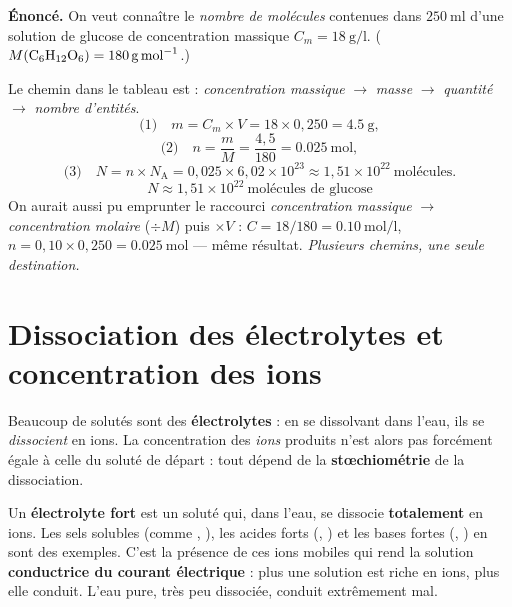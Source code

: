 \documentclass[11pt,a4paper]{article}
\newcommand{\NA}{N_{\!\text{A}}}
\begin{document}
\begin{exemple}
\textbf{Énoncé.} On veut connaître le \emph{nombre de molécules} contenues dans $\SI{250}{\milli\litre}$
d'une solution de glucose  de concentration massique $C_m = \SI{18}{\gram\per\litre}$.
($M(\ce{C6H12O6}) = \SI{180}{\gram\per\mole}$.)

\smallskip
Le chemin dans le tableau est : \emph{concentration massique} $\to$ \emph{masse} $\to$ \emph{quantité}
$\to$ \emph{nombre d'entités}.
\[ \text{(1)}\quad m = C_m\times V = 18 \times 0{,}250 = \SI{4.5}{\gram}, \]
\[ \text{(2)}\quad n = \frac{m}{M} = \frac{4{,}5}{180} = \SI{0.025}{\mole}, \]
\[ \text{(3)}\quad N = n\times\NA = 0{,}025 \times 6{,}02\times10^{23} \approx 1{,}51\times10^{22}\ \text{molécules}. \]
\[ \boxed{N \approx 1{,}51\times10^{22}\ \text{molécules de glucose}} \]
On aurait aussi pu emprunter le raccourci \emph{concentration massique} $\to$ \emph{concentration
molaire} ($\div M$) puis $\times V$ : $C = 18/180 = \SI{0.10}{\mole\per\litre}$, $n = 0{,}10\times0{,}250
= \SI{0.025}{\mole}$ — même résultat. \emph{Plusieurs chemins, une seule destination.}
\end{exemple}

\section{Dissociation des électrolytes et concentration des ions}
Beaucoup de solutés sont des \textbf{électrolytes} : en se dissolvant dans l'eau, ils se
\emph{dissocient} en ions. La concentration des \emph{ions} produits n'est alors pas forcément égale
à celle du soluté de départ : tout dépend de la \textbf{stœchiométrie} de la dissociation.

\begin{definition}
Un \textbf{électrolyte fort} est un soluté qui, dans l'eau, se dissocie \textbf{totalement} en ions.
Les sels solubles (comme , ), les acides forts (, ) et les bases
fortes (, ) en sont des exemples. C'est la présence de ces ions mobiles qui rend
la solution \textbf{conductrice du courant électrique} : plus une solution est riche en ions, plus
elle conduit. L'eau pure, très peu dissociée, conduit extrêmement mal.
\end{definition}
\end{document}
